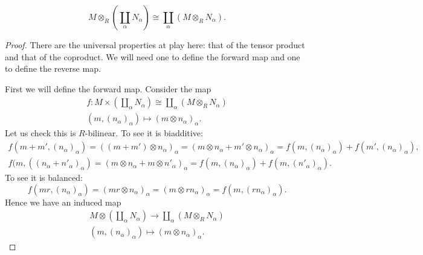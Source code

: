 \documentclass[12pt]{article}
\begin{document}
\begin{proposition}
	\begin{equation*}
		M\otimes_R (\coprod_\alpha N_\alpha) \cong \coprod_\alpha (M\otimes_R N_\alpha).
	\end{equation*}
\end{proposition}
\begin{proof}
	There are the universal properties at play here: that of the tensor product and that of the coproduct. We will need one to define the forward map and one to define the reverse map.

	First we will define the forward map. Consider the map 
	\begin{gather*}
		f:M\times (\coprod_\alpha N_\alpha) \cong \coprod_\alpha (M\otimes_R N_\alpha) \\
		(m,(n_\alpha)_\alpha) \mapsto (m\otimes n_\alpha)_\alpha.
	\end{gather*}
	Let us check this is $R$-bilinear. To see it is biadditive:
	\begin{gather*}
		f(m+m',(n_\alpha)_\alpha) = ((m+m')\otimes n_\alpha)_\alpha = (m\otimes n_\alpha + m'\otimes n_\alpha)_\alpha = f(m,(n_\alpha)_\alpha) + f(m',(n_\alpha)_\alpha), \\
		f(m, ((n_\alpha + n'_\alpha)_\alpha) = (m\otimes n_\alpha + m\otimes n'_\alpha)_\alpha = f(m,(n_\alpha)_\alpha) + f(m,(n'_\alpha)_\alpha).
	\end{gather*}
	To see it is balanced:
	\begin{equation*}
		f(mr,(n_\alpha)_\alpha) = (mr\otimes n_\alpha)_\alpha = (m\otimes rn_\alpha)_\alpha = f(m,(rn_\alpha)_\alpha).
	\end{equation*}
	Hence we have an induced map 
	\begin{gather*}
		M\otimes (\coprod_\alpha N_\alpha) \to \coprod_\alpha (M\otimes_R N_\alpha) \\
		(m,(n_\alpha)_\alpha) \mapsto (m\otimes n_\alpha)_\alpha.
	\end{gather*}


\end{proof}
\end{document}
